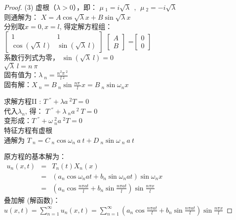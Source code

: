 \begin{example}
\begin{proof}
(3) 虚根（$\lambda >0$），即： $ \mu~_1=i\sqrt{\lambda}~~,~~\mu~_2=-i\sqrt{\lambda}$	\\
则通解为：	{ $\displaystyle 	X=A\cos \sqrt{\lambda}x+ B\sin \sqrt{\lambda}x $ } \\ 
分别取$x=0, x=l$, 得定解方程组：\\
$\left[
\begin{array}{lll}
	1&1\\
	\cos( {\sqrt{\lambda}~l}) &\sin ({\sqrt{\lambda}~l})
\end{array}
\right]$
$\left[
\begin{array}{ll}
	A\\
	B
\end{array}
\right]$
=$\left[
\begin{array}{ll}
	0\\
	0
\end{array}
\right]$\\ 
系数行列式为零， $ \sin ({\sqrt{\lambda}~l})=0$ \\
$ \sqrt{\lambda}~l=n~\pi$ \\ 
固有值为：$\displaystyle  \lambda~_n=\frac{n^2\pi~^2}{l~^2}$ \\ 
固有解：{\large $\displaystyle  X~_n=B~_n \sin \frac{n\pi~}{l} x=B~_n \sin \omega_n x $}

求解方程II : 	$\displaystyle  T~^{''} +\lambda {a~^2 T}=0 $ \\ 
代入$\lambda_n$, 得：
$\displaystyle  T~^{''} +\lambda~_n a~^2 ~T=0 $ \\
 变形成：$\displaystyle  T~^{''} +\omega ~_n ^2 {a~^2 T}=0 $ \\ 
特征方程有虚根\\
通解为 	$\displaystyle 	T~_n=C~_n\cos \omega_n~a~t+ D~_n\sin \omega ~_n~a~t $ \\  \vspace{0.3cm}

原方程的基本解为：\\
   $\begin{array}{llll}
	u_n(x,t) &=& T_n(t)X_n(x)\\
	&=& (a_n\cos \omega_nat+ b_n\sin \omega _nat ) \sin \omega_n x\\
	&=&(a_n\cos\frac{ n\pi at}{l}+ b_n\sin \frac{ n\pi at}{l}) \sin \frac{ n\pi x}{l}
\end{array}$ \\ 

 叠加解 (解函数)：\\ 
 $ \displaystyle u(x,t)=\sum_{n=1}^{\infty } u_n(x,t) = \sum_{n=1}^{\infty }  (a_n\cos\frac{ n\pi at}{l}+ b_n\sin \frac{ n\pi at}{l}) \sin \frac{ n\pi x}{l}$



\end{proof}
\end{example}
